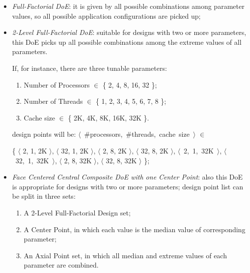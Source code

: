 \begin{itemize}

    \item \textit{Full-Factorial DoE}: it is given by all possible combinations among parameter values, so all possible application configurations are picked up;
 
    \item \textit{2-Level Full-Factorial DoE}: suitable for designs with two or more parameters, this DoE picks up all possible combinations among the extreme values of all parameters.
    
    If, for instance, there are three tunable parameters:
    
    \begin{enumerate}
    
        \item Number of Processors $\in$ \{ 2, 4, 8, 16, 32 \};
        
        \item Number of Threads $\in$ \{ 1, 2, 3, 4, 5, 6, 7, 8 \};
        
        \item Cache size $\in$ \{ 2K, 4K, 8K, 16K, 32K \}.
    
    \end{enumerate}
    
    design points will be: \hbox{$\langle$ \#processors, \#threads, cache size $\rangle$} $\in$
    
    \{ $\langle$ 2, 1, 2K $\rangle$, $\langle$ 32, 1, 2K $\rangle$, $\langle$ 2, 8, 2K $\rangle$, $\langle$ 32, 8, 2K $\rangle$, \hbox{$\langle$ 2, 1, 32K $\rangle$}, \hbox{$\langle$ 32, 1, 32K $\rangle$}, $\langle$ 2, 8, 32K $\rangle$, $\langle$ 32, 8, 32K $\rangle$ \};

    \item \textit{Face Centered Central Composite DoE with one Center Point}: also this DoE is appropriate for designs with two or more parameters; design point list can be split in three sets:
    
     \begin{enumerate}
    
        \item A 2-Level Full-Factorial Design set;
        
        \item A Center Point, in which each value is the median value of corresponding parameter;
        
        \item An Axial Point set, in which all median and extreme values of each parameter are combined.
    

\end{enumerate}
\end{itemize}
